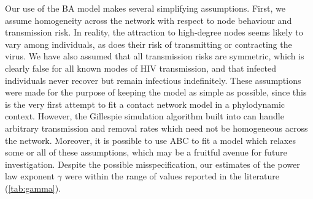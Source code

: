 Our use of the \gls{BA} model makes several simplifying assumptions. First, we
assume homogeneity across the network with respect to node behaviour and
transmission risk. In reality, the attraction to high-degree nodes seems likely
to vary among individuals, as does their risk of transmitting or contracting
the virus. We have also assumed that all transmission risks are symmetric,
which is clearly false for all known modes of \gls{HIV} transmission, and that
infected individuals never recover but remain infectious indefinitely. These
assumptions were made for the purpose of keeping the model as simple as
possible, since this is the very first attempt to fit a contact network model
in a phylodynamic context. However, the Gillespie simulation algorithm built
into  can handle arbitrary transmission and removal rates
which need not be homogeneous across the network. Moreover, it is possible to
use \gls{ABC} to fit a model which relaxes some or all of these assumptions,
which may be a fruitful avenue for future investigation.  Despite the possible
misspecification, our estimates of the power law exponent $\gamma$ were within
the range of values reported in the literature (\cref{tab:gamma}).
